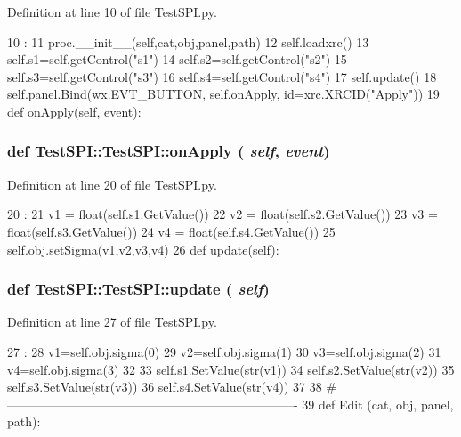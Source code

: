 Definition at line 10 of file TestSPI.py.


\begin{DoxyCode}
10                                              :
11         proc.__init__(self,cat,obj,panel,path)
12         self.loadxrc()
13         self.s1=self.getControl("s1")
14         self.s2=self.getControl("s2")
15         self.s3=self.getControl("s3")
16         self.s4=self.getControl("s4")
17         self.update()
18         self.panel.Bind(wx.EVT_BUTTON, self.onApply, id=xrc.XRCID("Apply"))
19 
    def onApply(self, event):
\end{DoxyCode}
\hypertarget{classTestSPI_1_1TestSPI_ae8f4c2ba34633ffe82da7b6f871ba3dd}{
\subsubsection[{onApply}]{\setlength{\rightskip}{0pt plus 5cm}def TestSPI::TestSPI::onApply ( {\em self}, \/   {\em event})}}
\label{classTestSPI_1_1TestSPI_ae8f4c2ba34633ffe82da7b6f871ba3dd}


Definition at line 20 of file TestSPI.py.


\begin{DoxyCode}
20                             :
21         v1 = float(self.s1.GetValue())
22         v2 = float(self.s2.GetValue())
23         v3 = float(self.s3.GetValue())
24         v4 = float(self.s4.GetValue())
25         self.obj.setSigma(v1,v2,v3,v4)
26 
    def update(self):
\end{DoxyCode}
\hypertarget{classTestSPI_1_1TestSPI_acf61b00c2d0123bc8d7bb2f7a2e4c28f}{
\subsubsection[{update}]{\setlength{\rightskip}{0pt plus 5cm}def TestSPI::TestSPI::update ( {\em self})}}
\label{classTestSPI_1_1TestSPI_acf61b00c2d0123bc8d7bb2f7a2e4c28f}


Definition at line 27 of file TestSPI.py.


\begin{DoxyCode}
27                     :
28         v1=self.obj.sigma(0)
29         v2=self.obj.sigma(1)
30         v3=self.obj.sigma(2)
31         v4=self.obj.sigma(3)
32 
33         self.s1.SetValue(str(v1))
34         self.s2.SetValue(str(v2))
35         self.s3.SetValue(str(v3))
36         self.s4.SetValue(str(v4))        
37 
38 #----------------------------------------------------------------------
39 
def Edit (cat, obj, panel, path):
\end{DoxyCode}


